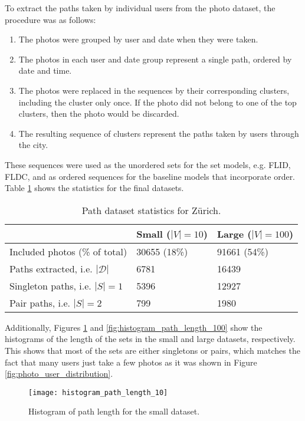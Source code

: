 To extract the paths taken by individual users from the photo dataset, the procedure was as follows:

\begin{enumerate}
  \item The photos were grouped by user and date when they were taken.
  \item The photos in each user and date group represent a single path, ordered by date and time.
  \item The photos were replaced in the sequences by their corresponding clusters, including the cluster only once. If the photo did not belong to one of the top clusters, then the photo would be discarded.
  \item The resulting sequence of clusters represent the paths taken by users through the city.
\end{enumerate}

These sequences were used as the unordered sets for the set models, e.g. FLID, FLDC, and as ordered sequences for the baseline models that incorporate order. Table \ref{tab:path-statistics} shows the statistics for the final datasets.

\begin{table}
  \centering
  \caption{Path dataset statistics for Zürich.}
  \begin{tabular}{@{}lll@{}}
    \toprule
    & Small ($|V|=10$)& Large ($|V|=100$)  \\
    \midrule
    Included photos (\% of total) & 30655 (18\%) & 91661 (54\%)\\
    Paths extracted, i.e. $|\mathcal{D}|$ & 6781 & 16439 \\
    Singleton paths, i.e. $|S|=1$ & 5396 & 12927 \\
    Pair paths, i.e. $|S|=2$ & 799 & 1980 \\
    \bottomrule
  \end{tabular}
  \label{tab:path-statistics}
\end{table}

Additionally, Figures \ref{fig:histogram_path_length_10} and \ref{fig:histogram_path_length_100} show the histograms of the length of the sets in the small and large datasets, respectively. This shows that most of the sets are either singletons or pairs, which matches the fact that many users just take a few photos as it was shown in Figure \ref{fig:photo_user_distribution}.

\begin{figure}
  \centering
  \texttt{[image: histogram\_path\_length\_10]}
  \caption{Histogram of path length for the small dataset.}
  \label{fig:histogram_path_length_10}
\end{figure}

